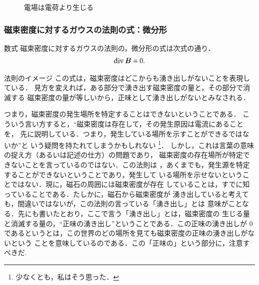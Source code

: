                 \begin{figure}[hbt]
                    \begin{center}
                        \caption{電場は電荷より生じる}
                        \label{fig:GaussLowEImage_03}
                    \end{center}
                \end{figure}

            \subsubsection{磁束密度に対するガウスの法則の式：微分形}
            \begin{mysmallsec}{数式}
                磁束密度に対するガウスの法則の，微分形の式は次式の通り．
                \begin{align}
                    \mathrm{div}\, \boldsymbol{B} = 0.
                \end{align}
            \end{mysmallsec}

            \begin{mysmallsec}{法則のイメージ}
                この式は，磁束密度はどこからも湧き出しがないことを表現している．
                見方を変えれば，ある部分で湧き出す磁束密度の量と，その部分で消滅する
                磁束密度の量が等しいから，正味として湧き出しがないとみなされる．

                つまり，磁束密度の発生場所を特定することはできないということである．
                こういう言い方すると，“磁束密度は存在して，その発生原因は電流にあることを，
                先に説明している．つまり，発生している場所を示すことができるではないか”と
                いう疑問を持たれてしまうかもしれない
                    \footnote{
                        少なくとも，私はそう思った．
                    }．
                しかし，これは言葉の意味の捉え方（あるいは記述の仕方）の問題であり，
                磁束密度の存在場所が特定できないことを言っているのではない．この法則は
                ，あくまでも，発生源を特定することができないということであり，発生して
                いる場所を示せないということではない．現に，磁石の周囲には磁束密度が存在
                していることは，すでに知っていることである．たしかに，磁石から磁束密度が
                湧き出していると考えても，間違いではないが，この法則の言っている「湧き出し」とは
                意味がことなる．先にも書いたとおり，ここで言う「湧き出し」とは，磁束密度の
                生じる量と消滅する量の，“正味の湧き出し”ということである．この正味の湧き出しが
                0であるというとは，この世界のどの場所を見ても磁束密度の正味の湧き出しがないという
                ことを意味しているのである．この「正味の」という部分に，注意すべきだ.
            \end{mysmallsec}

